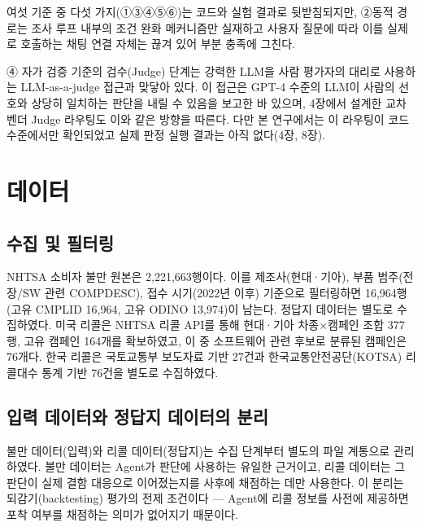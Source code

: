 \documentclass[11pt]{article}
\begin{document}
여섯 기준 중 다섯 가지(①③④⑤⑥)는 코드와 실험 결과로 뒷받침되지만, ②동적 경로는 조사 루프 내부의 조건 완화 메커니즘만 실재하고 사용자 질문에 따라 이를 실제로 호출하는 채팅 연결 자체는 끊겨 있어 부분 충족에 그친다.

④ 자가 검증 기준의 검수(Judge) 단계는 강력한 LLM을 사람 평가자의 대리로 사용하는 LLM-as-a-judge 접근과 맞닿아 있다. 이 접근은 GPT-4 수준의 LLM이 사람의 선호와 상당히 일치하는 판단을 내릴 수 있음을 보고한 바 있으며\cite{zheng2023judging}, 4장에서 설계한 교차 벤더 Judge 라우팅도 이와 같은 방향을 따른다. 다만 본 연구에서는 이 라우팅이 코드 수준에서만 확인되었고 실제 판정 실행 결과는 아직 없다(4장, 8장).

\section{데이터}

\subsection{수집 및 필터링}

NHTSA 소비자 불만 원본은 2,221,663행이다.
이를 제조사(현대·기아), 부품 범주(전장/SW 관련 COMPDESC), 접수 시기(2022년 이후) 기준으로 필터링하면 16,964행(고유 CMPLID 16,964, 고유 ODINO 13,974)이 남는다.
정답지 데이터는 별도로 수집하였다. 미국 리콜은 NHTSA 리콜 API를 통해 현대·기아 차종×캠페인 조합 377행, 고유 캠페인 164개를 확보하였고, 이 중 소프트웨어 관련 후보로 분류된 캠페인은 76개다. 한국 리콜은 국토교통부 보도자료 기반 27건과 한국교통안전공단(KOTSA) 리콜대수 통계 기반 76건을 별도로 수집하였다.

\subsection{입력 데이터와 정답지 데이터의 분리}

불만 데이터(입력)와 리콜 데이터(정답지)는 수집 단계부터 별도의 파일 계통으로 관리하였다. 불만 데이터는 Agent가 판단에 사용하는 유일한 근거이고, 리콜 데이터는 그 판단이 실제 결함 대응으로 이어졌는지를 사후에 채점하는 데만 사용한다. 이 분리는 되감기(backtesting) 평가의 전제 조건이다 — Agent에 리콜 정보를 사전에 제공하면 포착 여부를 채점하는 의미가 없어지기 때문이다.
\end{document}
